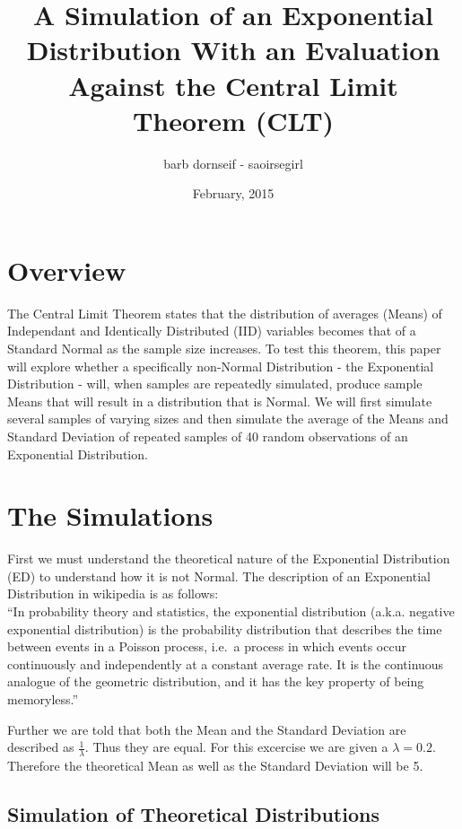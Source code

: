 \documentclass[]{article}
\title{A Simulation of an Exponential Distribution With an Evaluation Against
the Central Limit Theorem (CLT)}
\author{barb dornseif - saoirsegirl}
\date{February, 2015}
\begin{document}
\maketitle


\section{Overview}\label{overview}

The Central Limit Theorem states that the distribution of averages
(Means) of Independant and Identically Distributed (IID) variables
becomes that of a Standard Normal as the sample size increases. To test
this theorem, this paper will explore whether a specifically non-Normal
Distribution - the Exponential Distribution - will, when samples are
repeatedly simulated, produce sample Means that will result in a
distribution that is Normal. We will first simulate several samples of
varying sizes and then simulate the average of the Means and Standard
Deviation of repeated samples of 40 random observations of an
Exponential Distribution.

\section{The Simulations}\label{the-simulations}

First we must understand the theoretical nature of the Exponential
Distribution (ED) to understand how it is not Normal. The description of
an Exponential Distribution in wikipedia is as follows:\\``In
probability theory and statistics, the exponential distribution (a.k.a.
negative exponential distribution) is the probability distribution that
describes the time between events in a Poisson process, i.e.~a process
in which events occur continuously and independently at a constant
average rate. It is the continuous analogue of the geometric
distribution, and it has the key property of being memoryless.''

Further we are told that both the Mean and the Standard Deviation are
described as $\frac{1}{\lambda}$. Thus they are equal. For this
excercise we are given a $\lambda = 0.2$. Therefore the theoretical Mean
as well as the Standard Deviation will be 5.

\subsection{Simulation of Theoretical
Distributions}\label{simulation-of-theoretical-distributions}
\end{document}
